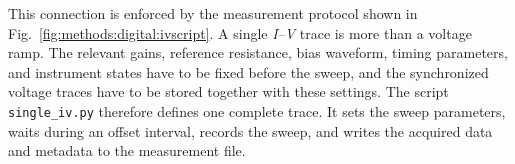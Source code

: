             This connection is enforced by the measurement protocol shown in Fig.~\ref{fig:methods:digital:ivscript}. A single \textit{I--V} trace is more than a voltage ramp. The relevant gains, reference resistance, bias waveform, timing parameters, and instrument states have to be fixed before the sweep, and the synchronized voltage traces have to be stored together with these settings. The script \texttt{single\_iv.py} therefore defines one complete trace. It sets the sweep parameters, waits during an offset interval, records the sweep, and writes the acquired data and metadata to the measurement file.

            \begin{figure}[t]
                \centering
                \hfill
\end{figure}
